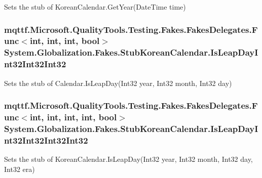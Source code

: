 Sets the stub of Korean\-Calendar.\-Get\-Year(\-Date\-Time time)

\hypertarget{class_system_1_1_globalization_1_1_fakes_1_1_stub_korean_calendar_a9ce10d5f6cc77ee3c55a4c51c40cec95}{
\subsubsection[{Is\-Leap\-Day\-Int32\-Int32\-Int32}]{\setlength{\rightskip}{0pt plus 5cm}mqttf.\-Microsoft.\-Quality\-Tools.\-Testing.\-Fakes.\-Fakes\-Delegates.\-Func$<$int, int, int, bool$>$ System.\-Globalization.\-Fakes.\-Stub\-Korean\-Calendar.\-Is\-Leap\-Day\-Int32\-Int32\-Int32}}\label{class_system_1_1_globalization_1_1_fakes_1_1_stub_korean_calendar_a9ce10d5f6cc77ee3c55a4c51c40cec95}


Sets the stub of Calendar.\-Is\-Leap\-Day(\-Int32 year, Int32 month, Int32 day)

\hypertarget{class_system_1_1_globalization_1_1_fakes_1_1_stub_korean_calendar_ad77ff207751b7c56e2f637679b40a454}{
\subsubsection[{Is\-Leap\-Day\-Int32\-Int32\-Int32\-Int32}]{\setlength{\rightskip}{0pt plus 5cm}mqttf.\-Microsoft.\-Quality\-Tools.\-Testing.\-Fakes.\-Fakes\-Delegates.\-Func$<$int, int, int, int, bool$>$ System.\-Globalization.\-Fakes.\-Stub\-Korean\-Calendar.\-Is\-Leap\-Day\-Int32\-Int32\-Int32\-Int32}}\label{class_system_1_1_globalization_1_1_fakes_1_1_stub_korean_calendar_ad77ff207751b7c56e2f637679b40a454}


Sets the stub of Korean\-Calendar.\-Is\-Leap\-Day(\-Int32 year, Int32 month, Int32 day, Int32 era)

